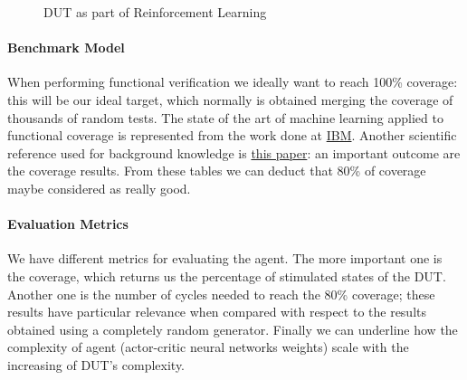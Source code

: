 \documentclass{article}
\begin{document}
\begin{figure}
\begin{center}
\begin{tikzpicture}[x=0.75pt,y=0.75pt,yscale=-1,xscale=0.8]
\end{tikzpicture}
\caption{DUT as part of Reinforcement Learning}
\label{RI}
\end{center}
\end{figure}

\paragraph{Benchmark Model}

When performing functional verification we ideally want to reach 100\% coverage: this will be our ideal target, which normally is obtained merging the coverage of thousands of random tests.
The state of the art of machine learning applied to functional coverage is represented from the work done at \href{http://www.research.ibm.com/haifa/dept/vst/hvt_psvtva.shtml}{IBM}. Another scientific reference used for background knowledge is \href{https://www.researchgate.net/publication/220306081_Coverage-Directed_Test_Generation_Automated_by_Machine_Learning_-_A_Review}{this paper}: an important outcome are the coverage results. From these tables we can deduct that 80\% of coverage maybe considered as really good. %


\paragraph{Evaluation Metrics}


We have different metrics for evaluating the agent. The more important one is the coverage, which returns us the percentage of stimulated states of the DUT. Another one is the number of cycles needed to reach the 80\% coverage; these results have particular relevance when compared with respect to the results obtained using a completely random generator. Finally we can underline how the complexity of agent (actor-critic neural networks weights) scale with the increasing of DUT's complexity.
\end{document}
